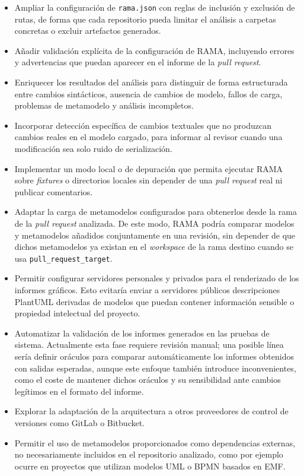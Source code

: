 \documentclass[11pt]{article}
\begin{document}
\begin{itemize}
    \item Ampliar la configuración de \texttt{rama.json} con reglas de inclusión y exclusión de rutas, de forma que cada repositorio pueda limitar el análisis a carpetas concretas o excluir artefactos generados.
    \item Añadir validación explícita de la configuración de RAMA, incluyendo errores y advertencias que puedan aparecer en el informe de la \textit{pull request}.
    \item Enriquecer los resultados del análisis para distinguir de forma estructurada entre cambios sintácticos, ausencia de cambios de modelo, fallos de carga, problemas de metamodelo y análisis incompletos.
    \item Incorporar detección específica de cambios textuales que no produzcan cambios reales en el modelo cargado, para informar al revisor cuando una modificación sea solo ruido de serialización.
    \item Implementar un modo local o de depuración que permita ejecutar RAMA sobre \textit{fixtures} o directorios locales sin depender de una \textit{pull request} real ni publicar comentarios.
    \item Adaptar la carga de metamodelos configurados para obtenerlos desde la rama de la \textit{pull request} analizada. De este modo, RAMA podría comparar modelos y metamodelos añadidos conjuntamente en una revisión, sin depender de que dichos metamodelos ya existan en el \textit{workspace} de la rama destino cuando se usa \texttt{pull\_request\_target}.
    \item Permitir configurar servidores personales y privados para el renderizado de los informes gráficos. Esto evitaría enviar a servidores públicos descripciones PlantUML derivadas de modelos que puedan contener información sensible o propiedad intelectual del proyecto.
    \item Automatizar la validación de los informes generados en las pruebas de sistema. Actualmente esta fase requiere revisión manual; una posible línea sería definir oráculos para comparar automáticamente los informes obtenidos con salidas esperadas, aunque este enfoque también introduce inconvenientes, como el coste de mantener dichos oráculos y su sensibilidad ante cambios legítimos en el formato del informe.
    \item Explorar la adaptación de la arquitectura a otros proveedores de control de versiones como GitLab o Bitbucket.
    \item Permitir el uso de metamodelos proporcionados como dependencias externas, no necesariamente incluidos en el repositorio analizado, como por ejemplo ocurre en proyectos que utilizan modelos UML o BPMN basados en EMF.

\end{itemize}
\end{document}
